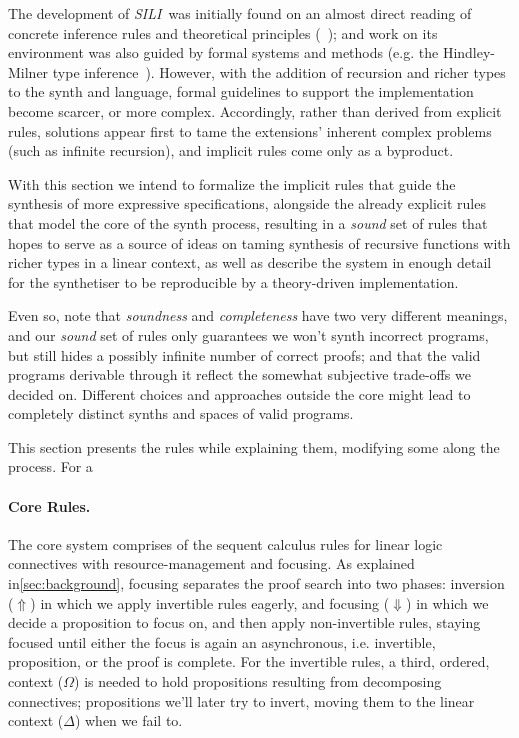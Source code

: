 \documentclass{llncs}
\newcommand{\mypara}[1]{\paragraph{\textbf{#1}.}}
\newcommand{\synname}{\emph{SILI}}
\begin{document}
The development of \synname\ was initially found on an almost direct reading of
concrete inference rules and theoretical principles (~\cite{frank pfenning notes}); and work on its environment
was also guided by formal systems and methods (e.g. the Hindley-Milner type
inference~\cite{}).  However, with the addition of recursion and richer types to
the synth and language, formal guidelines to support the implementation become
scarcer, or more complex. Accordingly, rather than derived from explicit rules,
solutions appear first to tame the extensions' inherent complex problems (such
as infinite recursion), and implicit rules come only as a byproduct.

With this section we intend to formalize the implicit rules that guide the
synthesis of more expressive specifications, alongside the already explicit
rules that model the core of the synth process, resulting in a \emph{sound} set
of rules that hopes to serve as a source of ideas on taming synthesis of
recursive functions with richer types in a linear context, as well as describe
the system in enough detail for the synthetiser to be reproducible by a
theory-driven implementation.

Even so, note that \emph{soundness} and \emph{completeness} have two very
different meanings, and our \emph{sound} set of rules only guarantees we won't
synth incorrect programs, but still hides a possibly infinite number of correct
proofs; and that the valid programs derivable through it reflect the somewhat
subjective trade-offs we decided on. Different choices and approaches outside
the core might lead to completely distinct synths and spaces of valid programs.

This section presents the rules while explaining them, modifying some along the
process. For a 


\mypara{Core Rules} The core system comprises of the sequent calculus rules for
linear logic connectives with resource-management and focusing. As explained in\ref{sec:background}, focusing separates the proof search into two
phases: inversion ($\Uparrow$) in which we apply invertible rules eagerly, and
focusing ($\Downarrow$) in which we decide a proposition to focus on, and then
apply non-invertible rules, staying focused until either the focus is again an
asynchronous, i.e. invertible, proposition, or the proof is complete.  For the
invertible rules, a third, ordered, context ($\Omega$) is needed to hold
propositions resulting from decomposing connectives; propositions we'll later try to
invert, moving them to the linear context ($\Delta$) when we fail to.
\end{document}
